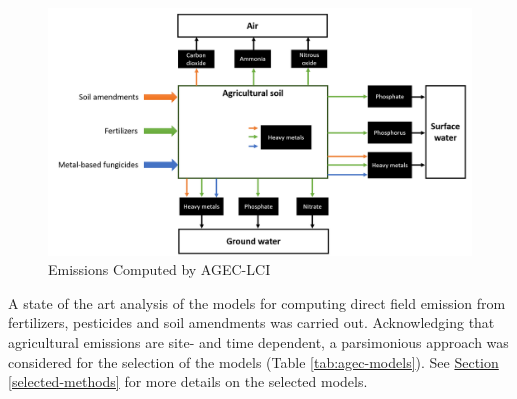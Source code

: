 \documentclass[openany]{book}
\begin{document}
\begin{figure}[ht]

{\centering \includegraphics[width=0.95\linewidth]{Figures/agec_lci_emissions} 

}

\caption{Emissions Computed by AGEC-LCI}\label{fig:agec-lci-emissions}
\end{figure}

A state of the art analysis of the models for computing direct field emission from fertilizers, pesticides and soil amendments was carried out. Acknowledging that agricultural emissions are site- and time dependent, a parsimonious approach was considered for the selection of the models (Table \ref{tab:agec-models}). See \protect\hyperlink{selected-methods}{Section} \ref{selected-methods} for more details on the selected models.
\end{document}
